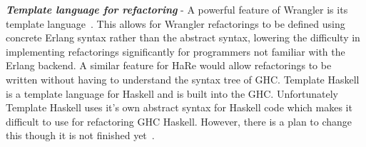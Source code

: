 \textit{\textbf{Template language for refactoring}} - A powerful feature of Wrangler is its template language~\citep{letsUser}. This allows for Wrangler refactorings to be defined using concrete Erlang syntax rather than the abstract syntax, lowering the difficulty in implementing refactorings significantly for programmers not familiar with the Erlang backend. A similar feature for HaRe would allow refactorings to be written without having to understand the syntax tree of GHC. Template Haskell is a template language for Haskell and is built into the GHC. \DIFaddbegin {}\DIFaddend Unfortunately Template Haskell uses it's own abstract syntax for Haskell code which makes it difficult to use for refactoring GHC Haskell. However, there is a plan to change this though it is not finished yet~\citep{ghcTreesGrow}.
\DIFaddbegin 

\textit{\textbf{}} \DIFaddend 




\cleardoublepage
{}
\label{index}
\printindex


